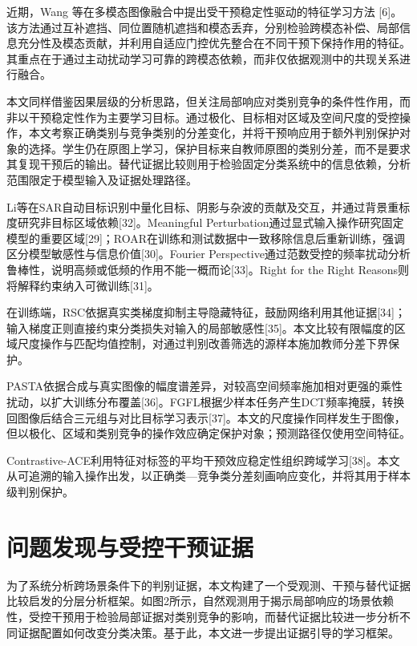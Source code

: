 \documentclass[journal,10pt,a4paper]{IEEEtran}
\begin{document}
近期，Wang 等在多模态图像融合中提出受干预稳定性驱动的特征学习方法 {[}6{]}。该方法通过互补遮挡、同位置随机遮挡和模态丢弃，分别检验跨模态补偿、局部信息充分性及模态贡献，并利用自适应门控优先整合在不同干预下保持作用的特征。其重点在于通过主动扰动学习可靠的跨模态依赖，而非仅依据观测中的共现关系进行融合。

本文同样借鉴因果层级的分析思路，但关注局部响应对类别竞争的条件性作用，而非以干预稳定性作为主要学习目标。通过极化、目标相对区域及空间尺度的受控操作，本文考察正确类别与竞争类别的分差变化，并将干预响应用于额外判别保护对象的选择。学生仍在原图上学习，保护目标来自教师原图的类别分差，而不是要求其复现干预后的输出。替代证据比较则用于检验固定分类系统中的信息依赖，分析范围限定于模型输入及证据处理路径。

Li等在SAR自动目标识别中量化目标、阴影与杂波的贡献及交互，并通过背景重标度研究非目标区域依赖{[}32{]}。Meaningful Perturbation通过显式输入操作研究固定模型的重要区域{[}29{]}；ROAR在训练和测试数据中一致移除信息后重新训练，强调区分模型敏感性与信息价值{[}30{]}。Fourier Perspective通过范数受控的频率扰动分析鲁棒性，说明高频或低频的作用不能一概而论{[}33{]}。Right for the Right Reasons则将解释约束纳入可微训练{[}31{]}。

在训练端，RSC依据真实类梯度抑制主导隐藏特征，鼓励网络利用其他证据{[}34{]}；输入梯度正则直接约束分类损失对输入的局部敏感性{[}35{]}。本文比较有限幅度的区域尺度操作与匹配均值控制，对通过判别改善筛选的源样本施加教师分差下界保护。

PASTA依据合成与真实图像的幅度谱差异，对较高空间频率施加相对更强的乘性扰动，以扩大训练分布覆盖{[}36{]}。FGFL根据少样本任务产生DCT频率掩膜，转换回图像后结合三元组与对比目标学习表示{[}37{]}。本文的尺度操作同样发生于图像，但以极化、区域和类别竞争的操作效应确定保护对象；预测路径仅使用空间特征。

Contrastive-ACE利用特征对标签的平均干预效应稳定性组织跨域学习{[}38{]}。本文从可追溯的输入操作出发，以正确类---竞争类分差刻画响应变化，并将其用于样本级判别保护。

\section{问题发现与受控干预证据}\label{ux95eeux9898ux53d1ux73b0ux4e0eux53d7ux63a7ux5e72ux9884ux8bc1ux636e}

为了系统分析跨场景条件下的判别证据，本文构建了一个受观测、干预与替代证据比较启发的分层分析框架。如图2所示，自然观测用于揭示局部响应的场景依赖性，受控干预用于检验局部证据对类别竞争的影响，而替代证据比较进一步分析不同证据配置如何改变分类决策。基于此，本文进一步提出证据引导的学习框架。
\end{document}
